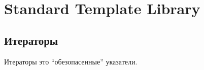 \section{Standard Template Library}

\subsection{Итераторы}

Итераторы это ``обезопасенные'' указатели.

